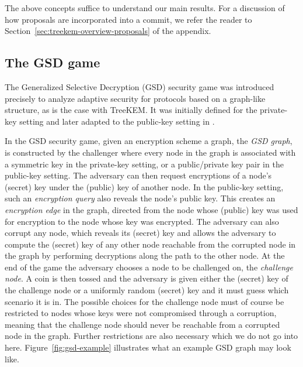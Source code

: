 The above concepts suffice to understand our main results. For a discussion of how proposals are incorporated into a commit, we refer the reader to Section~\ref{sec:treekem-overview-proposals} of the appendix.

\subsection{The GSD game} \label{sec:gsd-intro}

The Generalized Selective Decryption (GSD) security game \cite{gsd} was introduced precisely to analyze adaptive security for protocols based on a graph-like structure, as is the case with TreeKEM. It was initially defined for the private-key setting and later adapted to the public-key setting in \cite{ttkem}.

In the GSD security game, given an encryption scheme a graph, the \emph{GSD graph}, is constructed by the challenger where every node in the graph is associated with a symmetric key in the private-key setting, or a public/private key pair in the public-key setting. The adversary can then request encryptions of a node's (secret) key under the (public) key of another node. In the public-key setting, such an \emph{encryption query} also reveals the node's public key. This creates an \emph{encryption edge} in the graph, directed from the node whose (public) key was used for encryption to the node whose key was encrypted. The adversary can also corrupt any node, which reveals its (secret) key and allows the adversary to compute the (secret) key of any other node reachable from the corrupted node in the graph by performing decryptions along the path to the other node. At the end of the game the adversary chooses a node to be challenged on, the \emph{challenge node}. A coin is then tossed and the adversary is given either the (secret) key of the challenge node or a uniformly random (secret) key and it must guess which scenario it is in. The possible choices for the challenge node must of course be restricted to nodes whose keys were not compromised through a corruption, meaning that the challenge node should never be reachable from a corrupted node in the graph. Further restrictions are also necessary which we do not go into here. Figure~\ref{fig:gsd-example} illustrates what an example GSD graph may look like.

